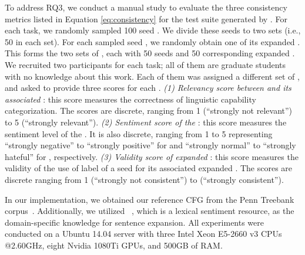 To address RQ3, we conduct a manual study to evaluate the three consistency metrics listed in Equation \eqref{eq:consistency} for the test suite generated by \tool. For each task, we randomly sampled 100 \tool seed \sents. We divide these seeds to two sets (i.e., 50 \sents in each set). For each sampled seed \sent, we randomly obtain one of its expanded \sents.
This forms the two sets of \sents, each with 50 seeds and 50 corresponding expanded \sents. We recruited two participants for each task; all of them are graduate students with no 
knowledge about this work. Each of them was assigned a different set of \sents, and asked to provide three scores for each \sent. \emph{(1) Relevancy score between \sent and its associated \lc}:
this score measures the correctness of \tool linguistic capability categorization.  The scores are discrete, ranging from 1 (``strongly not relevant'') to 5 (``strongly relevant'').
\emph{(2) Sentiment score of the \sent}: this score measures the sentiment level of the \sent . It is also discrete, ranging from 1 to 5 representing ``strongly negative'' to ``strongly positive'' for \sa and ``strongly normal'' to ``strongly hateful'' for \hsd, respectively.
\emph{(3) Validity score of expanded \sent}: this score measures the validity of the use of label of a seed \sent for its associated \tool expanded \sent. The scores are discrete ranging from 1 (``strongly not consistent'') to (``strongly consistent'').


 In our implementation, we obtained our reference CFG from the Penn Treebank corpus~\cite{mitchell1993treebank}. Additionally, we utilized \Swn~\cite{baccianella2010sentiwordnet}, which is a lexical sentiment resource, as the domain-specific knowledge for sentence expansion. All experiments were conducted on a Ubuntu 14.04 server with three Intel Xeon E5-2660 v3 CPUs @2.60GHz, eight Nvidia 1080Ti GPUs, and 500GB of RAM.
